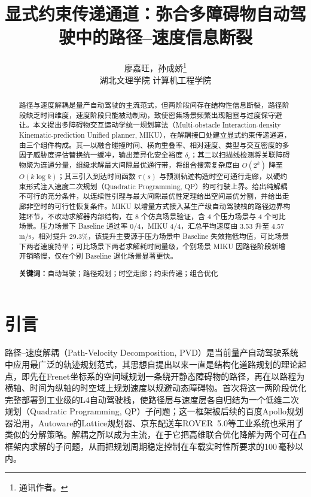 \documentclass[a4paper,11pt]{ctexart}
\title{显式约束传递通道：弥合多障碍物自动驾驶中的路径--速度信息断裂}
\author{廖嘉旺，孙成娇\thanks{通讯作者。}\\[2pt]\normalsize 湖北文理学院 计算机工程学院}
\date{}
\theoremstyle{definition}
\begin{document}
\maketitle

\begin{abstract}
\noindent
路径与速度解耦是量产自动驾驶的主流范式，但两阶段间存在结构性信息断裂，路径阶段缺乏时间维度，速度阶段只能被动制动，致使密集场景频繁出现阻塞与过度保守避让。本文提出多障碍物交互运动学统一规划算法（Multi-obstacle Interaction-density Kinematic-prediction Unified planner, MIKU），在解耦接口处建立显式约束传递通道，由三个组件构成。其一以融合碰撞时间、横向重叠率、相对速度、类型与交互密度的多因子威胁度评估替换统一缓冲，输出差异化安全裕度 $\delta_i$；其二以扫描线检测将关联障碍物聚为连通分量，组级求解最大间隙最优通行带，将组合搜索复杂度由 $O(2^k)$ 降至 $O(k\log k)$；其三引入到达时间函数 $\tau(s)$ 与预测轨迹构造时空可通行走廊，以硬约束形式注入速度二次规划（Quadratic Programming, QP）的可行驶上界。给出纯解耦不可行的充分条件，以连续性引理与最大间隙最优性定理给出空间最优分割，并给出走廊非空时的可行性恢复条件。MIKU 以增量方式接入某生产级自动驾驶栈的路径边界构建环节，不改动求解器内部结构，在 8 个仿真场景验证，含 4 个压力场景与 4 个可比场景。压力场景下 Baseline 通过率 0/4，MIKU 4/4，汇总平均速度由 3.53 升至 4.57 m/s，相对提升 29.3\%，该提升主要源于压力场景中 Baseline 失效拖低均值，可比场景下两者速度持平；可比场景下两者求解耗时同量级，个别场景 MIKU 因路径阶段新增开销略慢，仅在个别 Baseline 退化场景显著更快。

\vspace{0.5em}
\noindent\textbf{关键词：}自动驾驶；路径规划；时空走廊；约束传递；组合优化
\end{abstract}
\section{引言}
\label{sec:intro}

路径--速度解耦（Path-Velocity Decomposition, PVD）是当前量产自动驾驶系统中应用最广泛的轨迹规划范式，其思想自\citet{kant1986pvd}提出以来一直是结构化道路规划的理论起点，即先在Frenet坐标系的空间域规划一条绕开静态障碍物的路径，再在以路程为横轴、时间为纵轴的时空域上规划速度以规避动态障碍物。\citet{fan2018baidu}首次将这一两阶段优化完整部署到工业级的L4自动驾驶栈，使路径层与速度层各自归结为一个低维二次规划（Quadratic Programming, QP）子问题；这一框架被后续的百度Apollo规划器\citep{apollo2024}沿用，Autoware的Lattice规划器、京东配送车ROVER~5.0\citep{wang2022_jfr}等工业系统也采用了类似的分解策略。解耦之所以成为主流，在于它把高维联合优化降解为两个可在凸框架内求解的子问题，从而把规划周期稳定控制在车载实时性所要求的100\,毫秒以内\citep{fan2018baidu}。
\end{document}
